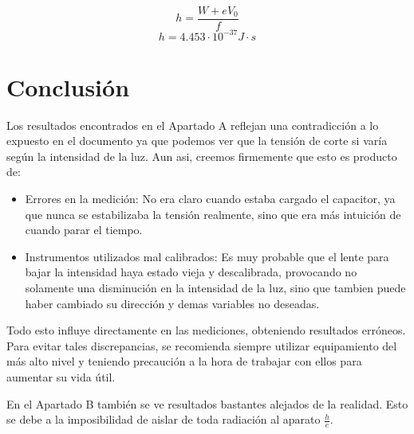 \documentclass[a4paper,12pt]{report}
\begin{document}
    $$h = \frac{W + eV_0}{f}$$
    $$h = 4.453 \cdot 10^{-37} J \cdot s$$


\chapter{Conclusión}

    Los resultados encontrados en el Apartado A reflejan una contradicción a lo expuesto en el documento ya que podemos
  ver que la tensión de corte si varía según la intensidad de la luz. Aun asi, creemos firmemente que esto es producto 
  de:
    \begin{itemize}
      \item Errores en la medición: No era claro cuando estaba cargado el capacitor, ya que nunca se estabilizaba la
      tensión realmente, sino que era más intuición de cuando parar el tiempo.
      \item Instrumentos utilizados mal calibrados: Es muy probable que el lente para bajar la intensidad haya estado
      vieja y descalibrada, provocando no solamente una disminución en la intensidad de la luz, sino que tambien
      puede haber cambiado su dirección y demas variables no deseadas.
    \end{itemize}
  Todo esto influye directamente en las mediciones, obteniendo resultados erróneos. Para evitar tales discrepancias,
  se recomienda siempre utilizar equipamiento del más alto nivel y teniendo precaución a la hora de trabajar con ellos
  para aumentar su vida útil.

  En el Apartado B también se ve resultados bastantes alejados de la realidad. Esto se debe a la imposibilidad de
  aislar de toda radiación al aparato $\frac{h}{e}$.
\end{document}
